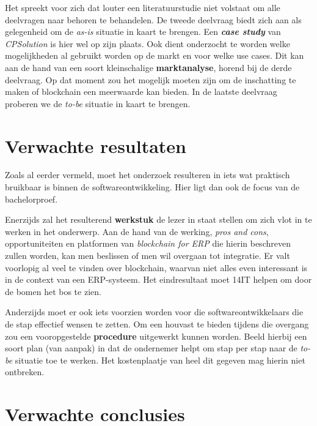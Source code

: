 Het spreekt voor zich dat louter een literatuurstudie niet volstaat om alle deelvragen naar behoren te behandelen. 
De tweede deelvraag biedt zich aan als gelegenheid om de \textit{as-is} situatie in kaart te brengen. Een \textbf{\textit{case study}} van \textit{CPSolution} is hier wel op zijn plaats. Ook dient onderzocht te worden welke mogelijkheden al gebruikt worden op de markt en voor welke use cases. Dit kan aan de hand van een soort kleinschalige \textbf{marktanalyse}, horend bij de derde deelvraag. Op dat moment zou het mogelijk moeten zijn om de inschatting te maken of blockchain een meerwaarde kan bieden. In de laatste deelvraag proberen we de \textit{to-be} situatie in kaart te brengen.


\section{Verwachte resultaten}
\label{sec:verwachte_resultaten}

Zoals al eerder vermeld, moet het onderzoek resulteren in iets wat praktisch bruikbaar is binnen de softwareontwikkeling. Hier ligt dan ook de focus van de bachelorproef.

Enerzijds zal het resulterend \textbf{werkstuk} de lezer in staat stellen om zich vlot in te werken in het onderwerp. Aan de hand van de werking, \textit{pros and cons}, opportuniteiten en platformen van \textit{blockchain for ERP} die hierin beschreven zullen worden, kan men beslissen of men wil overgaan tot integratie. Er valt voorlopig al veel te vinden over blockchain, waarvan niet alles even interessant is in de context van een ERP-systeem. Het eindresultaat moet 14IT helpen om door de bomen het bos te zien.

Anderzijds moet er ook iets voorzien worden voor die softwareontwikkelaars die de stap effectief wensen te zetten. Om een houvast te bieden tijdens die overgang zou een vooropgestelde \textbf{procedure} uitgewerkt kunnen worden. Beeld hierbij een soort plan (van aanpak) in dat de ondernemer helpt om stap per stap naar de \textit{to-be} situatie toe te werken. Het kostenplaatje van heel dit gegeven mag hierin niet ontbreken.


\section{Verwachte conclusies}
\label{sec:verwachte_conclusies}

